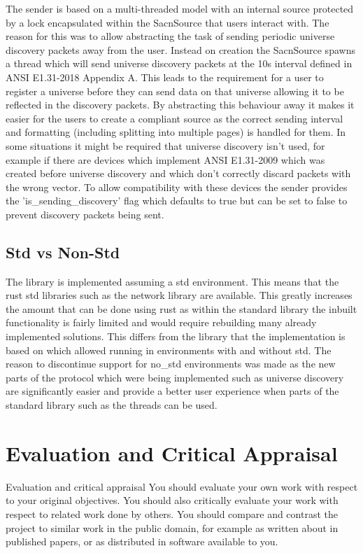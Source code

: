 \documentclass[11pt,a4paper]{report}
\begin{document}
The sender is based on a multi-threaded model with an internal source protected by a lock encapsulated within the SacnSource that users interact with. The reason for this was to allow abstracting the task of sending periodic universe discovery packets away from the user. Instead on creation the SacnSource spawns a thread which will send universe discovery packets at the 10s interval defined in ANSI E1.31-2018 Appendix A. This leads to the requirement for a user to register a universe before they can send data on that universe allowing it to be reflected in the discovery packets. By abstracting this behaviour away it makes it easier for the users to create a compliant source as the correct sending interval and formatting (including splitting into multiple pages) is handled for them. In some situations it might be required that universe discovery isn't used, for example if there are devices which implement ANSI E1.31-2009 which was created before universe discovery and which don't correctly discard packets with the wrong vector. To allow compatibility with these devices the sender provides the 'is\_sending\_discovery' flag which defaults to true but can be set to false to prevent discovery packets being sent.
	
\subsection{Std vs Non-Std}
The library is implemented assuming a std environment. This means that the rust std libraries such as the network library are available. This greatly increases the amount that can be done using rust as within the standard library the inbuilt functionality is fairly limited and would require rebuilding many already implemented solutions. This differs from the library that the implementation is based on which allowed running in environments with and without std. The reason to discontinue support for no\_std environments was made as the new parts of the protocol which were being implemented such as universe discovery are significantly easier and provide a better user experience when parts of the standard library such as the threads can be used. \\

\section{Evaluation and Critical Appraisal}
Evaluation and critical appraisal
You should evaluate your own work with respect to your original objectives. You should also critically evaluate your work with respect to related work done by others. You should compare and contrast the project to similar work in the public domain, for example as written about in published papers, or as distributed in software available to you.
	
\end{document}

